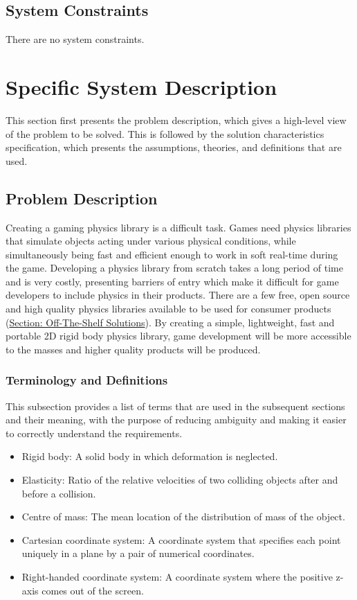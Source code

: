 \documentclass[12pt]{article}
\begin{document}
\subsection{System Constraints}
\label{Sec:SysConstraints}
There are no system constraints.
\section{Specific System Description}
\label{Sec:SpecSystDesc}
This section first presents the problem description, which gives a high-level view of the problem to be solved. This is followed by the solution characteristics specification, which presents the assumptions, theories, and definitions that are used.
\subsection{Problem Description}
\label{Sec:ProbDesc}
Creating a gaming physics library is a difficult task. Games need physics libraries that simulate objects acting under various physical conditions, while simultaneously being fast and efficient enough to work in soft real-time during the game. Developing a physics library from scratch takes a long period of time and is very costly, presenting barriers of entry which make it difficult for game developers to include physics in their products. There are a few free, open source and high quality physics libraries available to be used for consumer products (\hyperref[Sec:ExistingSolns]{Section: Off-The-Shelf Solutions}). By creating a simple, lightweight, fast and portable 2D rigid body physics library, game development will be more accessible to the masses and higher quality products will be produced.
\subsubsection{Terminology and Definitions}
\label{Sec:TermDefs}
This subsection provides a list of terms that are used in the subsequent sections and their meaning, with the purpose of reducing ambiguity and making it easier to correctly understand the requirements.
\begin{itemize}
\item{Rigid body: A solid body in which deformation is neglected.}
\item{Elasticity: Ratio of the relative velocities of two colliding objects after and before a collision.}
\item{Centre of mass: The mean location of the distribution of mass of the object.}
\item{Cartesian coordinate system: A coordinate system that specifies each point uniquely in a plane by a pair of numerical coordinates.}
\item{Right-handed coordinate system: A coordinate system where the positive z-axis comes out of the screen.}
\end{itemize}
\end{document}
